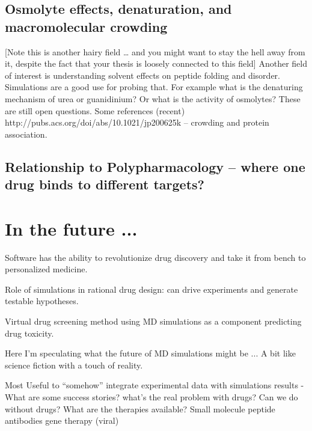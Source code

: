 \subsection{Osmolyte effects, denaturation, and macromolecular crowding}

[Note this is another hairy field … and you might want to stay the hell away from it, despite the fact that your thesis is loosely connected to this field] Another field of interest is understanding solvent effects on peptide folding and disorder. Simulations are a good use for probing that.  For example what is the denaturing mechanism of urea or guanidinium? Or what is the activity of osmolytes? These are still open questions.
Some references (recent)
http://pubs.acs.org/doi/abs/10.1021/jp200625k -- crowding and protein association.

\subsection{Relationship to Polypharmacology -- where one drug binds to different targets?}


\section{In the future ...}

Software has the ability to revolutionize drug discovery and take it from bench to personalized medicine.  

Role of simulations in rational drug design: can drive experiments and generate testable hypotheses.

Virtual drug screening method using MD simulations as a component predicting drug toxicity.

Here I'm speculating what the future of MD simulations might be ... A bit like science fiction with a touch of reality.

Most Useful to “somehow” integrate experimental data with simulations results\cite{that nature paper discussing integrating MD and systems biology}
- What are some success stories?
what’s the real problem with drugs?
Can we do without drugs? What are the therapies available?
Small molecule
peptide
antibodies
gene therapy (viral)
\cite{Hansen:2012hh}

